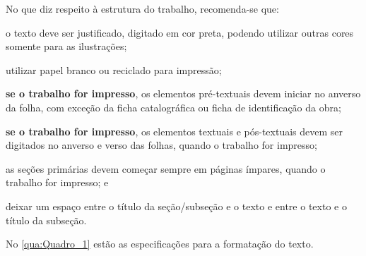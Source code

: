 No que diz respeito à estrutura do trabalho, recomenda-se que:
\begin{alineas}
	\item o texto deve ser justificado, digitado em cor preta, podendo utilizar outras cores somente para as ilustrações;
	\item utilizar papel branco ou reciclado para impressão;
	\item  \textbf{se o trabalho for impresso}, os elementos pré-textuais devem iniciar no anverso da folha, com exceção da ficha catalográfica ou ficha de identificação da obra;
	\item \textbf{se o trabalho for impresso}, os elementos textuais e pós-textuais devem ser digitados no anverso e verso das folhas, quando o trabalho for impresso;

	\item as seções primárias devem começar sempre em páginas ímpares, quando o trabalho for impresso; e 
	\item deixar um espaço entre o título da seção/subseção e o texto e entre o texto e o título da subseção.
\end{alineas}

No \autoref{qua:Quadro_1} estão as especificações para a formatação do texto.

